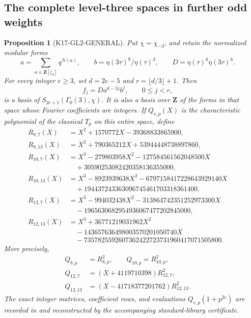 \documentclass[11pt,a4paper]{article}
\newtheorem{proposition}[theorem]{Proposition}
\theoremstyle{definition}
\begin{document}
\subsection{The complete level-three spaces in further odd weights}
\label{sec:gl2-general-model}

\begin{proposition}[K17-GL2-GENERAL]\label{prop:gl2-general}
Put $\chi=\chi_{-3}$, and retain the normalized modular forms
\[
 a=\sum_{\alpha\in\mathbf Z[\zeta_3]}q^{N(\alpha)},\qquad
 b=\eta(3\tau)^9/\eta(\tau)^3,\qquad
 D=\eta(\tau)^6\eta(3\tau)^6.
\]
For every integer $e\ge3$, set $d=2e-5$ and $r=\lfloor d/3\rfloor+1$.
Then
\[
 f_j=Da^{d-3j}b^j,\qquad 0\le j<r,
 \tag{G1}
\]
is a basis of $S_{2e+1}(\Gamma_0(3),\chi)$. It is also a basis over
$\mathbf Z$ of the forms in that space whose Fourier coefficients are
integers. If $Q_{e,p}(X)$ is the characteristic polynomial of the
classical $T_p$ on this entire space, define
\begin{align*}
R_{8,7}(X)&=X^2+1570772X-39368833865900,\\
R_{8,13}(X)&=X^2+790365212X+53944448738897860,\\
R_{10,7}(X)&=X^3-279803958X^2-127584561562048500X\\
&\quad+30590253082420358136355000,\\
R_{10,13}(X)&=X^3-8923939638X^2-6797158417228643929140X\\
&\quad+194437243363096745461703318361400,\\
R_{12,7}(X)&=X^3-994032438X^2-313864742351252973300X\\
&\quad-1965630682954936067477202845000,\\
R_{12,13}(X)&=X^3+36771219031962X^2\\
&\quad-143657636498003570201050740X\\
&\quad-7357825592607362422723731960417071505800.
\end{align*}
More precisely,
\[
\begin{split}
 Q_{8,p}&=R_{8,p}^2,\qquad Q_{10,p}=R_{10,p}^2,\\
 Q_{12,7}&=(X+4119710398)R_{12,7}^2,\\
 Q_{12,13}&=(X-41718377201762)R_{12,13}^2.
\end{split}
\tag{G2}
\]
The exact integer matrices, coefficient rows, and evaluations
$Q_{e,p}(1+p^{2e})$ are recorded in
 and reconstructed by
the accompanying standard-library certificate.
\end{proposition}
\end{document}
